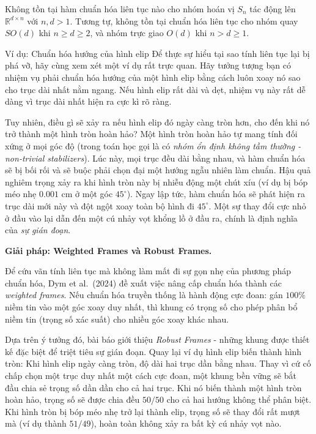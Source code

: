 \begin{theorem}
\label{thm:no-continuous-canon}
Không tồn tại hàm chuẩn hóa liên tục nào cho nhóm hoán vị $S_n$ tác động lên $\mathbb{R}^{d \times n}$ với $n, d > 1$. Tương tự, không tồn tại chuẩn hóa liên tục cho nhóm quay $SO(d)$ khi $n \geq d \geq 2$, và nhóm trực giao $O(d)$ khi $n > d \geq 1$.
\end{theorem}

\begin{examplebox}{Ví dụ: Chuẩn hóa hướng của hình elip}
Để thực sự hiểu tại sao tính liên tục lại bị phá vỡ, hãy cùng xem xét một ví dụ rất trực quan. Hãy tưởng tượng bạn có nhiệm vụ phải chuẩn hóa hướng của một hình elip bằng cách luôn xoay nó sao cho trục dài nhất nằm ngang. Nếu hình elip rất dài và dẹt, nhiệm vụ này rất dễ dàng vì trục dài nhất hiện ra cực kì rõ ràng. 

Tuy nhiên, điều gì sẽ xảy ra nếu hình elip đó ngày càng tròn hơn, cho đến khi nó trở thành một hình tròn hoàn hảo? Một hình tròn hoàn hảo tự mang tính đối xứng ở mọi góc độ (trong toán học gọi là có \textit{nhóm ổn định không tầm thường - non-trivial stabilizers}). Lúc này, mọi trục đều dài bằng nhau, và hàm chuẩn hóa sẽ bị bối rối và sẽ buộc phải chọn đại một hướng ngẫu nhiên làm chuẩn. 
Hậu quả nghiêm trọng xảy ra khi hình tròn này bị nhiễu động một chút xíu (ví dụ bị bóp méo nhẹ $0.001$ cm ở một góc $45^\circ$). Ngay lập tức, hàm chuẩn hóa sẽ phát hiện ra trục dài mới này và đột ngột xoay toàn bộ hình đi $45^\circ$. Một sự thay đổi cực nhỏ ở đầu vào lại dẫn đến một cú nhảy vọt khổng lồ ở đầu ra, chính là định nghĩa của \textit{sự gián đoạn}.
\end{examplebox}

\textbf{Giải pháp: Weighted Frames và Robust Frames.}

Để cứu vãn tính liên tục mà không làm mất đi sự gọn nhẹ của phương pháp chuẩn hóa, Dym et al.\ (2024) đề xuất việc nâng cấp chuẩn hóa thành các \textit{weighted frames}. Nếu chuẩn hóa truyền thống là hành động cực đoan: gán $100\%$ niềm tin vào một góc xoay duy nhất, thì khung có trọng số cho phép phân bổ niềm tin (trọng số xác suất) cho nhiều góc xoay khác nhau. 

Dựa trên ý tưởng đó, bài báo giới thiệu \textit{Robust Frames} - những khung được thiết kế đặc biệt để triệt tiêu sự gián đoạn. Quay lại ví dụ hình elip biến thành hình tròn: Khi hình elip ngày càng tròn, độ dài hai trục dần bằng nhau. Thay vì cứ cố chấp chọn một trục duy nhất một cách cực đoan, một khung bền vững sẽ bắt đầu chia sẻ trọng số dần dần cho cả hai trục. Khi nó biến thành một hình tròn hoàn hảo, trọng số sẽ được chia đều $50/50$ cho cả hai hướng không thể phân biệt. Khi hình tròn bị bóp méo nhẹ trở lại thành elip, trọng số sẽ thay đổi rất mượt mà (ví dụ thành $51/49$), hoàn toàn không xảy ra bất kỳ cú nhảy vọt nào.

